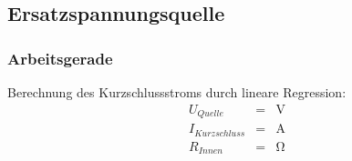 \documentclass[10pt]{report}
\begin{document}
        \subsection{Ersatzspannungsquelle}
        \subsubsection{Arbeitsgerade}
        \begin{center}
        \end{center}

        Berechnung des Kurzschlussstroms durch lineare Regression:
        \begin{eqnarray*}
            U_{Quelle} &=& \si{\volt}\\
            I_{Kurzschluss} &=& \si{\ampere}\\
            R_{Innen} &=& \si{\ohm}
        \end{eqnarray*}
\end{document}
